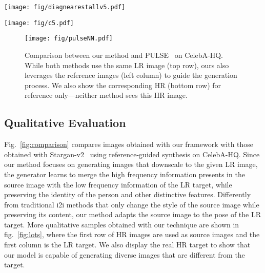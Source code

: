     \begin{figure*}
    \begin{center}
    
    \texttt{[image: fig/diagnearestallv5.pdf]}
    \end{center}
       \caption{Qualitative reference-guided image synthesis results on CelebA-HQ. Our method takes the HR source images (top row), and translates them according to the LR target (left column). We also add the real HR target (not seen by the network) for visual comparison. \textbf{See supplementary material for more results}.}
    \label{fig:lots}
    \end{figure*}

\begin{figure*}
    \begin{center}
    \hspace{-1cm}
    \texttt{[image: fig/c5.pdf]}
    \end{center}
       \caption{Comparison between our method and reference guided Stargan-v2~\cite{starganv} on CelebA-HQ. For both methods, we use the same HR image as source (left column). For the reference image, our method uses the LR images (top row) while Stargan-v2~\cite{starganv} uses the corresponding HR (bottom row).}
    \label{fig:comparison}
    \end{figure*}



\begin{figure}
    \begin{center}
\texttt{[image: fig/pulseNN.pdf]}
    \end{center}
       \caption{Comparison between our method and PULSE~\cite{pulse} on CelebA-HQ. While both methods use the same LR image (top row), ours also leverages the reference images (left column) to guide the generation process. We also show the corresponding HR (bottom row) for reference only---neither method sees this HR image.}
    \label{fig:pulse}
    \end{figure}
\subsection{Qualitative Evaluation}

Fig.~\ref{fig:comparison} compares images obtained with our framework with those obtained with Stargan-v2~\cite{starganv} using reference-guided synthesis on CelebA-HQ. Since our method focuses on generating images that downscale to the given LR image, the generator learns to merge the high frequency information presents in the source image with the low frequency information of the LR target, while preserving the identity of the person and other distinctive features. Differently from traditional i2i methods that only change the style of the source image while preserving its content, our method adapts the source image to the pose of the LR target. More qualitative samples obtained with our technique are shown in fig.~\ref{fig:lots}, where the first row of HR images are used as source images and the first column is the LR target. We also display the real HR target to show that our model is capable of generating diverse images that are different from the target.


